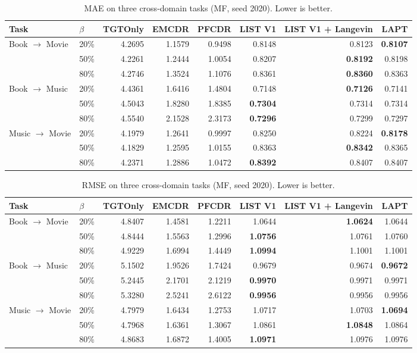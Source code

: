 \begin{table}[htbp]
\centering
\caption{MAE on three cross-domain tasks (MF, seed 2020). Lower is better.}
\small
\setlength{\tabcolsep}{4pt}
\begin{tabular}{llrrrrrr}
\toprule
Task & $\beta$ & TGTOnly & EMCDR & PFCDR & LIST V1 & LIST V1 + Langevin & LAPT \\
\midrule
Book $\rightarrow$ Movie & 20\% & 4.2695 & 1.1579 & 0.9498 & 0.8148 & 0.8123 & \textbf{0.8107} \\
 & 50\% & 4.2261 & 1.2444 & 1.0054 & 0.8207 & \textbf{0.8192} & 0.8198 \\
 & 80\% & 4.2746 & 1.3524 & 1.1076 & 0.8361 & \textbf{0.8360} & 0.8363 \\
\midrule
Book $\rightarrow$ Music & 20\% & 4.4361 & 1.6416 & 1.4804 & 0.7148 & \textbf{0.7126} & 0.7141 \\
 & 50\% & 4.5043 & 1.8280 & 1.8385 & \textbf{0.7304} & 0.7314 & 0.7314 \\
 & 80\% & 4.5540 & 2.1528 & 2.3173 & \textbf{0.7296} & 0.7299 & 0.7297 \\
\midrule
Music $\rightarrow$ Movie & 20\% & 4.1979 & 1.2641 & 0.9997 & 0.8250 & 0.8224 & \textbf{0.8178} \\
 & 50\% & 4.1829 & 1.2595 & 1.0155 & 0.8363 & \textbf{0.8342} & 0.8365 \\
 & 80\% & 4.2371 & 1.2886 & 1.0472 & \textbf{0.8392} & 0.8407 & 0.8407 \\
\bottomrule
\end{tabular}
\end{table}

\begin{table}[htbp]
\centering
\caption{RMSE on three cross-domain tasks (MF, seed 2020). Lower is better.}
\small
\setlength{\tabcolsep}{4pt}
\begin{tabular}{llrrrrrr}
\toprule
Task & $\beta$ & TGTOnly & EMCDR & PFCDR & LIST V1 & LIST V1 + Langevin & LAPT \\
\midrule
Book $\rightarrow$ Movie & 20\% & 4.8407 & 1.4581 & 1.2211 & 1.0644 & \textbf{1.0624} & 1.0644 \\
 & 50\% & 4.8444 & 1.5563 & 1.2996 & \textbf{1.0756} & 1.0761 & 1.0760 \\
 & 80\% & 4.9229 & 1.6994 & 1.4449 & \textbf{1.0994} & 1.1001 & 1.1001 \\
\midrule
Book $\rightarrow$ Music & 20\% & 5.1502 & 1.9526 & 1.7424 & 0.9679 & 0.9674 & \textbf{0.9672} \\
 & 50\% & 5.2445 & 2.1701 & 2.1219 & \textbf{0.9970} & 0.9971 & 0.9971 \\
 & 80\% & 5.3280 & 2.5241 & 2.6122 & \textbf{0.9956} & 0.9956 & 0.9956 \\
\midrule
Music $\rightarrow$ Movie & 20\% & 4.7979 & 1.6434 & 1.2753 & 1.0717 & 1.0703 & \textbf{1.0694} \\
 & 50\% & 4.7968 & 1.6361 & 1.3067 & 1.0861 & \textbf{1.0848} & 1.0864 \\
 & 80\% & 4.8683 & 1.6872 & 1.4005 & \textbf{1.0971} & 1.0976 & 1.0976 \\
\bottomrule
\end{tabular}
\end{table}
